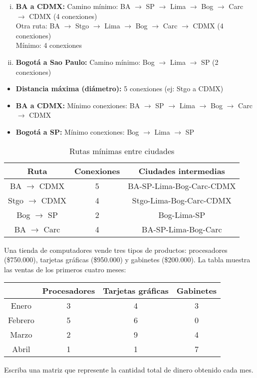 \begin{prob}
\begin{myproof}
\begin{enumerate}[i.]
\item \textbf{BA a CDMX:} 
Camino mínimo: BA $\to$ SP $\to$ Lima $\to$ Bog $\to$ Carc $\to$ CDMX (4 conexiones) \\
Otra ruta: BA $\to$ Stgo $\to$ Lima $\to$ Bog $\to$ Carc $\to$ CDMX (4 conexiones) \\
Mínimo: 4 conexiones

\item \textbf{Bogotá a Sao Paulo:} 
Camino mínimo: Bog $\to$ Lima $\to$ SP (2 conexiones)
\end{enumerate}

\begin{itemize}
\item \textbf{Distancia máxima (diámetro):} 5 conexiones (ej: Stgo a CDMX)
\item \textbf{BA a CDMX:} Mínimo  conexiones: BA $\to$ SP $\to$ Lima $\to$ Bog $\to$ Carc $\to$ CDMX
\item \textbf{Bogotá a SP:} Mínimo  conexiones: Bog $\to$ Lima $\to$ SP
\end{itemize}

\begin{table}[H]
\centering
\begin{tabular}{c|c|c}
\textbf{Ruta} & \textbf{Conexiones} & \textbf{Ciudades intermedias} \\
\hline
BA $\to$ CDMX & 5 & BA-SP-Lima-Bog-Carc-CDMX \\
Stgo $\to$ CDMX & 4 & Stgo-Lima-Bog-Carc-CDMX \\
Bog $\to$ SP & 2 & Bog-Lima-SP \\
BA $\to$ Carc & 4 & BA-SP-Lima-Bog-Carc \\
\end{tabular}
\caption{Rutas mínimas entre ciudades}
\end{table}
\end{myproof}
\end{prob}

\begin{prob} 
Una tienda de computadores vende tres tipos de productos: procesadores (\$750.000), tarjetas gráficas (\$950.000) y gabinetes (\$200.000). La tabla muestra las ventas de los primeros cuatro meses:

\begin{table}[H]\centering
\begin{tabular}{|c||c|c|c|}\hline
& Procesadores & Tarjetas gráficas & Gabinetes\\\hline
Enero & 3 & 4 & 3\\
Febrero & 5 & 6 & 0\\
Marzo & 2 & 9 & 4\\
Abril & 1 & 1 & 7\\\hline
\end{tabular}
\end{table}

Escriba una matriz que represente la cantidad total de dinero obtenido cada mes.
\end{prob}

